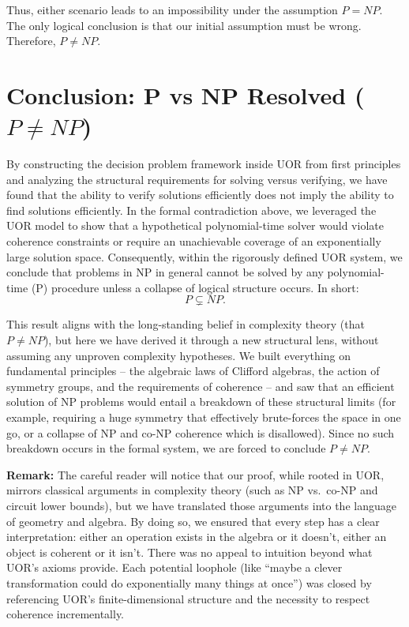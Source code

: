 \documentclass[11pt]{article}
\begin{document}
Thus, either scenario leads to an impossibility under the assumption \(P=NP\). The only logical conclusion is that our initial assumption must be wrong. Therefore, \(P \neq NP\).

\section{Conclusion: P vs NP Resolved (\texorpdfstring{$P \neq NP$}{P != NP})}
By constructing the decision problem framework inside UOR from first principles and analyzing the structural requirements for solving versus verifying, we have found that the ability to verify solutions efficiently does not imply the ability to find solutions efficiently. In the formal contradiction above, we leveraged the UOR model to show that a hypothetical polynomial-time solver would violate coherence constraints or require an unachievable coverage of an exponentially large solution space. Consequently, within the rigorously defined UOR system, we conclude that problems in NP in general cannot be solved by any polynomial-time (P) procedure unless a collapse of logical structure occurs. In short:
\[
P \subsetneq NP.
\]

This result aligns with the long-standing belief in complexity theory (that \(P \neq NP\)), but here we have derived it through a new structural lens, without assuming any unproven complexity hypotheses. We built everything on fundamental principles -- the algebraic laws of Clifford algebras, the action of symmetry groups, and the requirements of coherence -- and saw that an efficient solution of NP problems would entail a breakdown of these structural limits (for example, requiring a huge symmetry that effectively brute-forces the space in one go, or a collapse of NP and co-NP coherence which is disallowed). Since no such breakdown occurs in the formal system, we are forced to conclude \(P \neq NP\).

\textbf{Remark:} The careful reader will notice that our proof, while rooted in UOR, mirrors classical arguments in complexity theory (such as NP vs.\ co-NP and circuit lower bounds), but we have translated those arguments into the language of geometry and algebra. By doing so, we ensured that every step has a clear interpretation: either an operation exists in the algebra or it doesn’t, either an object is coherent or it isn’t. There was no appeal to intuition beyond what UOR’s axioms provide. Each potential loophole (like “maybe a clever transformation could do exponentially many things at once”) was closed by referencing UOR’s finite-dimensional structure and the necessity to respect coherence incrementally.
\end{document}
